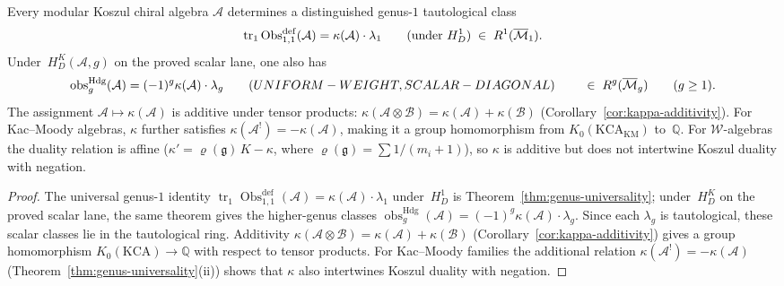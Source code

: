 \begin{corollary}\label{cor:tautological-class-map}
Every modular Koszul chiral algebra $\mathcal{A}$ determines a
distinguished genus-$1$ tautological class
\[
\operatorname{tr}_1\operatorname{Obs}^{\mathrm{def}}_{1,1}(\mathcal{A}) = \kappa(\mathcal{A}) \cdot \lambda_1
\qquad \textup{(under $H_D^1$)}
\;\in\; R^1(\overline{\mathcal{M}}_1).
\]
Under~$H_D^K(\mathcal A,g)$ on the proved scalar lane, one also has
\[
\operatorname{obs}^{\mathrm{Hdg}}_g(\mathcal{A})
=(-1)^g\kappa(\mathcal{A}) \cdot \lambda_g
\qquad \textup{(}UNIFORM-WEIGHT, SCALAR-DIAGONAL\textup{)}
\qquad \;\in\; R^g(\overline{\mathcal{M}}_g)
\qquad (g \geq 1).
\]
The assignment $\mathcal{A} \mapsto \kappa(\mathcal{A})$ is additive
under tensor products:
$\kappa(\mathcal{A} \otimes \mathcal{B}) =
\kappa(\mathcal{A}) + \kappa(\mathcal{B})$
\textup{(}Corollary~\ref{cor:kappa-additivity}\textup{)}. For
Kac--Moody algebras, $\kappa$ further satisfies
$\kappa(\mathcal{A}^!) = -\kappa(\mathcal{A})$, making it a group
homomorphism from $K_0(\mathrm{KCA}_{\mathrm{KM}})$ to~$\mathbb{Q}$.
For $\mathcal{W}$-algebras the duality relation is affine
\textup{(}$\kappa' = \varrho(\mathfrak{g})\,K - \kappa$, where
$\varrho(\mathfrak{g}) = \sum 1/(m_i+1)$\textup{)}, so $\kappa$ is
additive but does not intertwine Koszul duality with negation.
\end{corollary}

\begin{proof}
The universal genus-$1$ identity
$\operatorname{tr}_1\operatorname{Obs}^{\mathrm{def}}_{1,1}(\mathcal{A}) = \kappa(\mathcal{A}) \cdot \lambda_1$
under~$H_D^1$ is Theorem~\ref{thm:genus-universality}; under~$H_D^K$ on the proved scalar lane,
the same theorem gives the higher-genus classes
	$\operatorname{obs}^{\mathrm{Hdg}}_g(\mathcal{A})
	=(-1)^g\kappa(\mathcal{A}) \cdot \lambda_g$.
	Since each $\lambda_g$ is tautological, these scalar classes lie in the
tautological ring. Additivity
$\kappa(\mathcal{A} \otimes \mathcal{B}) =
\kappa(\mathcal{A}) + \kappa(\mathcal{B})$
\textup{(}Corollary~\ref{cor:kappa-additivity}\textup{)} gives a group
homomorphism $K_0(\mathrm{KCA}) \to \mathbb{Q}$ with respect to tensor
products. For Kac--Moody families the additional relation
$\kappa(\mathcal{A}^!) = -\kappa(\mathcal{A})$
\textup{(}Theorem~\ref{thm:genus-universality}(ii)\textup{)} shows
that $\kappa$ also intertwines Koszul duality with negation.
\end{proof}

